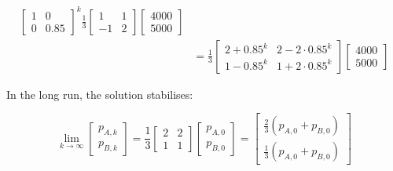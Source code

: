 \begin{paracol}{2}
\begin{align*}
\begin{bmatrix}
        1 & 0 \\
        0 & 0.85
    \end{bmatrix}^k \frac{1}{3} \begin{bmatrix}
        1 & 1 \\
        -1 & 2
    \end{bmatrix} \begin{bmatrix}
        4000 \\ 5000
    \end{bmatrix} \\
    & = \frac{1}{3} \begin{bmatrix}
        2 + 0.85^k & 2 - 2 \cdot 0.85^k \\
        1 - 0.85^k & 1 + 2 \cdot 0.85^k
    \end{bmatrix} \begin{bmatrix}
        4000 \\ 5000
    \end{bmatrix}
\end{align*}

In the long run, the solution stabilises:

$$
\lim_{k \rightarrow \infty}{\begin{bmatrix}
    p_{A, k} \\ p_{B, k}
\end{bmatrix}} = \frac{1}{3} \begin{bmatrix}
    2 & 2 \\
    1 & 1
\end{bmatrix} \begin{bmatrix}
    p_{A, 0} \\ p_{B, 0}
\end{bmatrix} = \begin{bmatrix}
    \frac{2}{3} (p_{A, 0} + p_{B, 0}) \\
    \frac{1}{3} (p_{A, 0} + p_{B, 0})
\end{bmatrix}
$$

\end{paracol}
